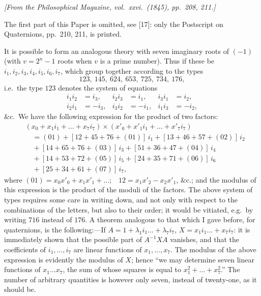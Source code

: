 \documentclass[12pt,a4paper]{article}
\begin{document}
\textit{[From the Philosophical Magazine, vol.~xxvi.~(1845), pp.~208, 211.]}

\bigskip
\setcounter{page}{127}

The first part of this Paper is omitted, see [17]: only the Postscript on Quaternions, pp.~210, 211, is printed.

\medskip

It is possible to form an analogous theory with seven imaginary roots of $(-1)$ (with $v = 2^n - 1$ roots when $v$ is a prime number). Thus if these be $i_1, i_2, i_3, i_4, i_5, i_6, i_7$, which group together according to the types
\[
123,\ 145,\ 624,\ 653,\ 725,\ 734,\ 176,
\]
i.e.\ the type $123$ denotes the system of equations
\begin{align*}
i_1 i_2 &= i_3, & i_2 i_3 &= i_1, & i_3 i_1 &= i_2,\\
i_2 i_1 &= -i_3, & i_3 i_2 &= -i_1, & i_1 i_3 &= -i_2,
\end{align*}
\&c.\ We have the following expression for the product of two factors:
\begin{align*}
&(x_0 + x_1 i_1 + \ldots + x_7 i_7) \times (x'_0 + x'_1 i_1 + \ldots + x'_7 i_7)\\
&\quad= (01) + [12 + 45 + 76 + (01)]\,i_1 + [13 + 46 + 57 + (02)]\,i_2\\
&\quad+ [14 + 65 + 76 + (03)]\,i_3 + [51 + 36 + 47 + (04)]\,i_4\\
&\quad+ [14 + 53 + 72 + (05)]\,i_5 + [24 + 35 + 71 + (06)]\,i_6\\
&\quad+ [25 + 34 + 61 + (07)]\,i_7,
\end{align*}
where $(01) = x_0 x'_0 + x_1 x'_1 + \ldots$;\ \ $12 = x_1 x'_2 - x_2 x'_1$, \&c.;
and the modulus of this expression is the product of the moduli of the factors. The above system of types requires some care in writing down, and not only with respect to the combinations of the letters, but also to their order; it would be vitiated, e.g.\ by writing $716$ instead of $176$. A theorem analogous to that which I gave before, for quaternions, is the following:---If $A = 1 + \lambda_1 i_1 \ldots + \lambda_7 i_7$, $X = x_1 i_1 \ldots + x_7 i_7$: it is immediately shown that the possible part of $A^{-1}XA$ vanishes, and that the coefficients of $i_1, \ldots, i_7$ are linear functions of $x_1, \ldots, x_7$. The modulus of the above expression is evidently the modulus of $X$; hence ``we may determine seven linear functions of $x_1\ldots x_7$, the sum of whose squares is equal to $x_1^2 + \ldots + x_7^2$.'' The number of arbitrary quantities is however only seven, instead of twenty-one, as it should be.
\end{document}
